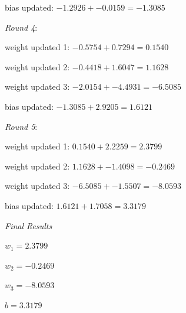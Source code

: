 \documentclass[12pt, fullpage,letterpaper]{article}
\begin{document}
\begin{enumerate}
\begin{enumerate}
    bias updated: $-1.2926 + -0.0159 = -1.3085$
    
    \emph{Round 4}:
    
    weight updated 1: $-0.5754 + 0.7294 = 0.1540$
    
    weight updated 2: $-0.4418 + 1.6047 = 1.1628$
    
    weight updated 3: $-2.0154 + -4.4931 = -6.5085$
    
    bias updated: $-1.3085 + 2.9205 = 1.6121$
    
    \emph{Round 5}:
    
    weight updated 1: $0.1540 + 2.2259 = 2.3799$
    
    weight updated 2: $1.1628 + -1.4098 = -0.2469$
    
    weight updated 3: $-6.5085 + -1.5507 = -8.0593$
    
    bias updated: $1.6121 + 1.7058 = 3.3179$
    
    \emph{Final Results}
    
    $w_1 = 2.3799$
    
    $w_2 = -0.2469$
    
    $w_3 = -8.0593$
    
    $b = 3.3179$
	
\end{enumerate}
\end{enumerate}
\end{document}
